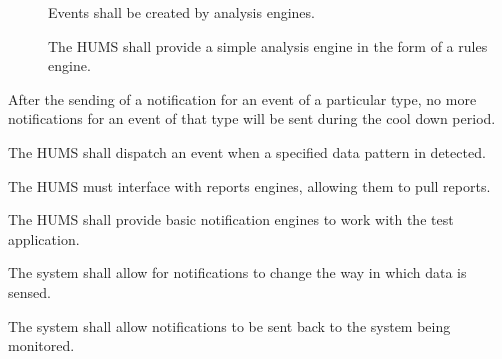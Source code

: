 \begin{description}
\begin{description}
			\item[] Events shall be created by analysis engines.

 			\item[] The HUMS shall provide a simple analysis 				engine in the form of a rules engine.
	\end{description}
	
	\item[\fr{8}]After the sending of a notification for an event of a particular 		type, no more notifications for an event of that type will be sent 				during the cool down period.
	\item[\fr{9}]The HUMS shall dispatch an event when a specified data 	pattern in detected.
	\item[\fr{10}] The HUMS must interface with reports engines, allowing 			them to pull reports.
	\item[\fr{11}] The HUMS shall provide basic notification 					engines to work with the test application.
	\item[\fr{12}] The system shall allow for notifications to change the way in 		which data is sensed.
	 \item[\fr{13}] The system shall allow notifications to be sent back to the 		system being monitored.
\end{description}

